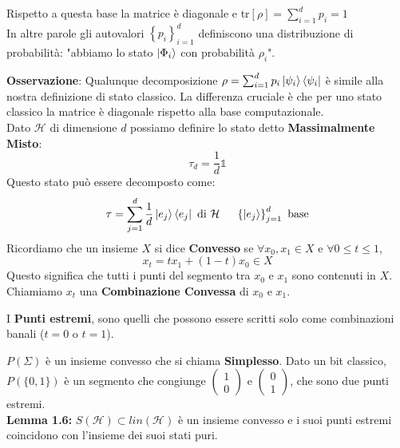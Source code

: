 \documentclass{report}
\begin{document}
Rispetto a questa base la matrice è diagonale e tr$[\rho] = \sum^d_{i=1} p_i = 1$
\\In altre parole gli autovalori $\left\{  p_i \right\}^d_{i=1}$ definiscono una distribuzione di probabilità: "abbiamo lo stato $\ket{ \Phi_i}$ con probabilità $\rho_i$".

\textbf{Osservazione}: Qualunque decomposizione $\rho = \sum^d_{i=1} p_i \ket{\psi_i}\bra{\psi_i}$ è simile alla nostra definizione di stato classico. La differenza cruciale è che per uno stato classico la matrice è diagonale rispetto alla base computazionale.
\medskip
\\Dato $\mathcal{H}$ di dimensione $d$ possiamo definire lo stato detto \textbf{Massimalmente Misto}: $$\tau_d=\frac{1}{d}\mathbb{1}$$
Questo stato può essere decomposto come:
$$\tau = \sum^d_{j=1} \frac{1}{d} \ket{e_j}\bra{e_j} \text{ di } \mathcal{H} \hspace{0.5cm} \left\{ \ket{e_j} \right\}^d_{j=1} \text{ base}$$
Ricordiamo che un insieme $X$ si dice \textbf{Convesso} se $\forall x_0,x_1 \in X$ e $\forall 0 \le t\le 1$, 
$$x_t = tx_1 + (1-t)x_0 \in X$$
Questo significa che tutti i punti del segmento tra $x_0$ e $x_1$ sono contenuti in $X$. Chiamiamo $x_t$ una \textbf{Combinazione Convessa} di $x_0$ e $x_1$. 

I \textbf{Punti estremi}, sono quelli che possono essere scritti solo come combinazioni banali ($t=0$ o $t=1$).

$P(\Sigma)$ è un insieme convesso che si chiama \textbf{Simplesso}. Dato un bit classico, $P(\{0,1\})$ è un segmento che congiunge $\begin{pmatrix}
    1 \\ 0
\end{pmatrix}
\text{ e }
\begin{pmatrix}
    0\\1
\end{pmatrix}
$, che sono due punti estremi.
\medskip
\\ \textbf{Lemma 1.6:} $S(\mathcal{H}) \subset \textit{lin}(\mathcal{H})$ è un insieme convesso e i suoi punti estremi coincidono con l'insieme dei suoi stati puri. 
\end{document}
